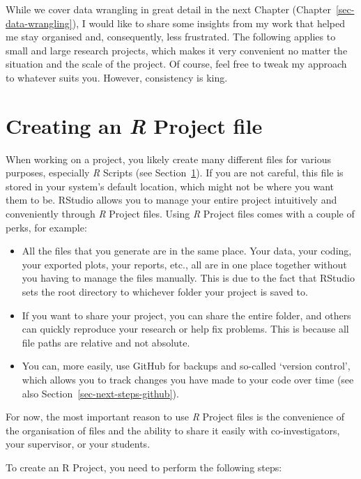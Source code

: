 \documentclass[
  letterpaper,
]{krantz}
\begin{document}
While we cover data wrangling in great detail in the next Chapter
(Chapter~\ref{sec-data-wrangling}), I would like to share some insights
from my work that helped me stay organised and, consequently, less
frustrated. The following applies to small and large research projects,
which makes it very convenient no matter the situation and the scale of
the project. Of course, feel free to tweak my approach to whatever suits
you. However, consistency is king.

\section{\texorpdfstring{Creating an \emph{R} Project
file}{Creating an R Project file}}\label{sec-creating-an-r-project}

When working on a project, you likely create many different files for
various purposes, especially \emph{R} Scripts (see
Section~\ref{sec-creating-an-r-project}). If you are not careful, this
file is stored in your system's default location, which might not be
where you want them to be. RStudio allows you to manage your entire
project intuitively and conveniently through \emph{R} Project files.
Using \emph{R} Project files comes with a couple of perks, for example:

\begin{itemize}
\item
  All the files that you generate are in the same place. Your data, your
  coding, your exported plots, your reports, etc., all are in one place
  together without you having to manage the files manually. This is due
  to the fact that RStudio sets the root directory to whichever folder
  your project is saved to.
\item
  If you want to share your project, you can share the entire folder,
  and others can quickly reproduce your research or help fix problems.
  This is because all file paths are relative and not absolute.
\item
  You can, more easily, use GitHub for backups and so-called `version
  control', which allows you to track changes you have made to your code
  over time (see also Section~\ref{sec-next-steps-github}).
\end{itemize}

For now, the most important reason to use \emph{R} Project files is the
convenience of the organisation of files and the ability to share it
easily with co-investigators, your supervisor, or your students.

To create an R Project, you need to perform the following steps:
\end{document}
